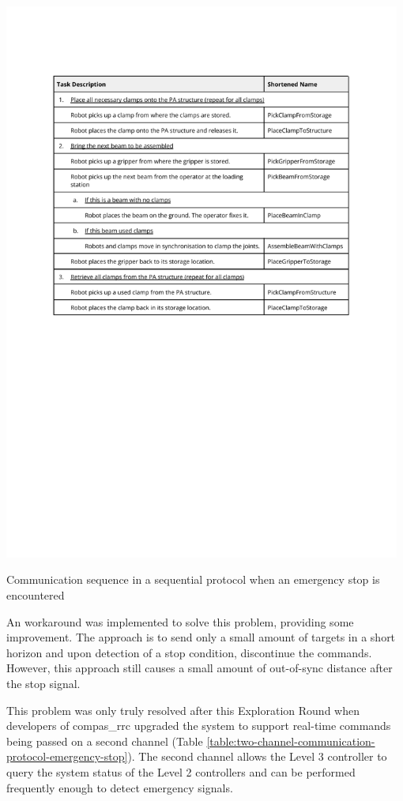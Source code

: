 \begin{table}[!h]
    \includegraphics[page=7, trim=25.4mm 200mm 25.4mm 25mm, clip, width=0.98\textwidth]{tables/Tables in Chapter 6.pdf}
    \caption{Communication sequence in a sequential protocol when an emergency stop is encountered}
    \label{table:sequential-communication-protocol-emergency-stop}
\end{table}

An workaround was implemented to solve this problem, providing some improvement. The approach is to send only a small amount of targets in a short horizon and upon detection of a stop condition, discontinue the commands. However, this approach still causes a small amount of out-of-sync distance after the stop signal. 

This problem was only truly resolved after this Exploration Round when developers of compas\_rrc upgraded the system to support real-time commands being passed on a second channel (Table \ref{table:two-channel-communication-protocol-emergency-stop}). The second channel allows the Level 3 controller to query the system status of the Level 2 controllers and can be performed frequently enough to detect emergency signals.

